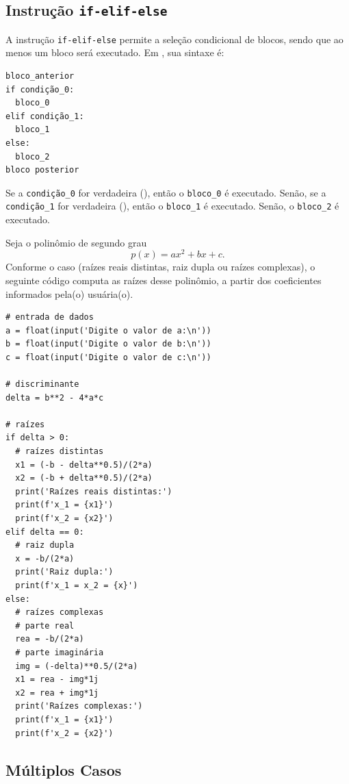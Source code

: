 \subsection{Instrução \texttt{if-elif-else}}

A instrução \lstinline+if-elif-else+ permite a seleção condicional de blocos, sendo que ao menos um bloco será executado. Em {\python}, sua sintaxe é:

\begin{lstlisting}
bloco_anterior
if condição_0:
  bloco_0
elif condição_1:
  bloco_1
else:
  bloco_2
bloco posterior
\end{lstlisting}

Se a \lstinline+condição_0+ for verdadeira ({\PYTHONTrue}), então o \lstinline+bloco_0+ é executado. Senão, se a \lstinline+condição_1+ for verdadeira ({\PYTHONTrue}), então o \lstinline+bloco_1+ é executado. Senão, o \lstinline+bloco_2+ é executado.

\begin{ex}
  Seja o polinômio de segundo grau
  \begin{equation}
    p(x) = ax^2 + bx + c.
  \end{equation}
  Conforme o caso (raízes reais distintas, raiz dupla ou raízes complexas), o seguinte código computa as raízes desse polinômio, a partir dos coeficientes informados pela(o) usuária(o).

\begin{lstlisting}
# entrada de dados
a = float(input('Digite o valor de a:\n'))
b = float(input('Digite o valor de b:\n'))
c = float(input('Digite o valor de c:\n'))

# discriminante
delta = b**2 - 4*a*c

# raízes
if delta > 0:
  # raízes distintas
  x1 = (-b - delta**0.5)/(2*a)
  x2 = (-b + delta**0.5)/(2*a)
  print('Raízes reais distintas:')
  print(f'x_1 = {x1}')
  print(f'x_2 = {x2}')
elif delta == 0:
  # raiz dupla
  x = -b/(2*a)
  print('Raiz dupla:')
  print(f'x_1 = x_2 = {x}')
else:
  # raízes complexas
  # parte real
  rea = -b/(2*a)
  # parte imaginária
  img = (-delta)**0.5/(2*a)
  x1 = rea - img*1j
  x2 = rea + img*1j
  print('Raízes complexas:')
  print(f'x_1 = {x1}')
  print(f'x_2 = {x2}')
\end{lstlisting}

\end{ex}

\subsection{Múltiplos Casos}

